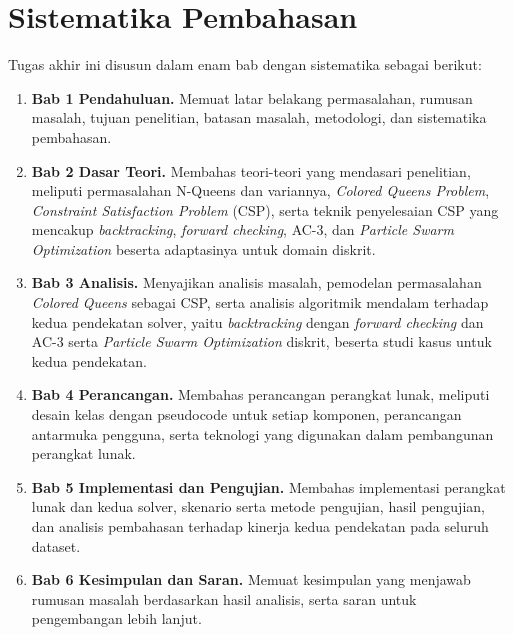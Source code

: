 \section{Sistematika Pembahasan}
\label{sec:sispem}

Tugas akhir ini disusun dalam enam bab dengan sistematika sebagai berikut:

\begin{enumerate}
	\item \textbf{Bab 1 Pendahuluan.} Memuat latar belakang permasalahan, rumusan masalah, tujuan penelitian, batasan masalah, metodologi, dan sistematika pembahasan.
	
	\item \textbf{Bab 2 Dasar Teori.} Membahas teori-teori yang mendasari penelitian, meliputi permasalahan N-Queens dan variannya, \textit{Colored Queens Problem}, \textit{Constraint Satisfaction Problem} (CSP), serta teknik penyelesaian CSP yang mencakup \textit{backtracking}, \textit{forward checking}, AC-3, dan \textit{Particle Swarm Optimization} beserta adaptasinya untuk domain diskrit.
	
	\item \textbf{Bab 3 Analisis.} Menyajikan analisis masalah, pemodelan permasalahan \textit{Colored Queens} sebagai CSP, serta analisis algoritmik mendalam terhadap kedua pendekatan solver, yaitu \textit{backtracking} dengan \textit{forward checking} dan AC-3 serta \textit{Particle Swarm Optimization} diskrit, beserta studi kasus untuk kedua pendekatan.
	
	\item \textbf{Bab 4 Perancangan.} Membahas perancangan perangkat lunak, meliputi desain kelas dengan pseudocode untuk setiap komponen, perancangan antarmuka pengguna, serta teknologi yang digunakan dalam pembangunan perangkat lunak.
	
	\item \textbf{Bab 5 Implementasi dan Pengujian.} Membahas implementasi perangkat lunak dan kedua solver, skenario serta metode pengujian, hasil pengujian, dan analisis pembahasan terhadap kinerja kedua pendekatan pada seluruh dataset.
	
	\item \textbf{Bab 6 Kesimpulan dan Saran.} Memuat kesimpulan yang menjawab rumusan masalah berdasarkan hasil analisis, serta saran untuk pengembangan lebih lanjut.
\end{enumerate}
